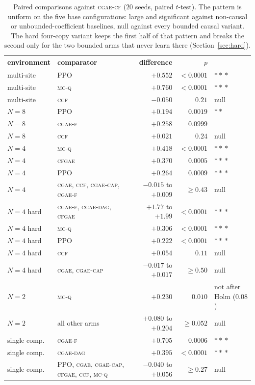\documentclass[review,authoryear,3p,times]{elsarticle}
\newcommand{\cgae}{\textsc{cgae}}              %
\newcommand{\cflow}{\textsc{cgae-cf}}          %
\newcommand{\cflowraw}{\textsc{cgae-f}}        %
\newcommand{\cdag}{\textsc{cgae-dag}}          %
\newcommand{\ccap}{\textsc{cgae-cap}}          %
\newcommand{\ccf}{\textsc{ccf}}
\newcommand{\mcq}{\textsc{mc-q}}
\newcommand{\cfgae}{\textsc{cfgae}}
\begin{document}
\begin{table}[tbp]
\centering
\caption{Paired comparisons against \cflow{} ($20$ seeds, paired $t$-test).
The pattern is uniform on the five base configurations: large and significant
against non-causal or unbounded-coefficient baselines, null against every
bounded causal variant. The hard four-copy variant keeps the first half of
that pattern and breaks the second only for the two bounded arms that never
learn there (Section~\ref{sec:hard}).}
\label{tab:paired}
\small
\begin{tabular}{llrrl}
\toprule
environment & comparator & difference & $p$ & \\
\midrule
multi-site & PPO        & $+0.552$ & $<0.0001$ & $\ast\!\ast\!\ast$ \\
multi-site & \mcq       & $+0.760$ & $<0.0001$ & $\ast\!\ast\!\ast$ \\
multi-site & \ccf       & $-0.050$ & $0.21$    & null \\
$N{=}8$    & PPO        & $+0.194$ & $0.0019$  & $\ast\!\ast$ \\
$N{=}8$    & \cflowraw  & $+0.258$ & $0.0999$  & \\
$N{=}8$    & \ccf       & $+0.021$ & $0.24$    & null \\
$N{=}4$    & \mcq       & $+0.418$ & $<0.0001$ & $\ast\!\ast\!\ast$ \\
$N{=}4$    & \cfgae     & $+0.370$ & $0.0005$  & $\ast\!\ast\!\ast$ \\
$N{=}4$    & PPO        & $+0.264$ & $0.0009$  & $\ast\!\ast\!\ast$ \\
$N{=}4$    & \cgae, \ccf, \ccap, \cflowraw & $-0.015$ to $+0.009$ & $\ge 0.43$ & null \\
$N{=}4$ hard & \cflowraw, \cdag, \cfgae & $+1.77$ to $+1.99$ & $<0.0001$ & $\ast\!\ast\!\ast$ \\
$N{=}4$ hard & \mcq       & $+0.306$ & $<0.0001$ & $\ast\!\ast\!\ast$ \\
$N{=}4$ hard & PPO        & $+0.222$ & $<0.0001$ & $\ast\!\ast\!\ast$ \\
$N{=}4$ hard & \ccf       & $+0.054$ & $0.11$    & null \\
$N{=}4$ hard & \cgae, \ccap & $-0.017$ to $+0.017$ & $\ge 0.50$ & null \\
$N{=}2$    & \mcq       & $+0.230$ & $0.010$   & not after Holm ($0.08$) \\
$N{=}2$    & all other arms & $+0.080$ to $+0.204$ & $\ge 0.052$ & null \\
single comp. & \cflowraw & $\mathbf{+0.705}$ & $\mathbf{0.0006}$ & $\ast\!\ast\!\ast$ \\
single comp. & \cdag     & $\mathbf{+0.395}$ & $\mathbf{<0.0001}$ & $\ast\!\ast\!\ast$ \\
single comp. & PPO, \cgae, \ccap, \cfgae, \ccf, \mcq & $-0.040$ to $+0.056$ & $\ge 0.27$ & null \\
\bottomrule
\end{tabular}
\end{table}
\end{document}
